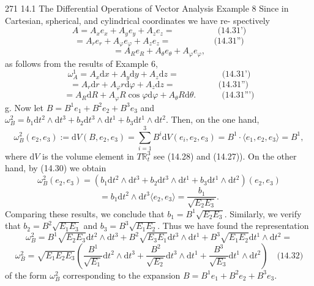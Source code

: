 271 14.1 The Differential Operations of Vector Analysis
Example 8 Since in Cartesian, spherical, and cylindrical coordinates we have re-
spectively
$$A = A_x e_x + A_y e_y + A_z e_z = \quad \quad \quad \quad \quad \text{(14.31')}$$
$$= A_r e_r + A_\varphi e_\varphi + A_z e_z = \quad \quad \quad \quad \quad \text{(14.31'')}$$
$$= A_R e_R + A_\theta e_\theta + A_\varphi e_\varphi,$$
as follows from the results of Example 6,
$$\omega^1_A = A_x \mathrm{d}x + A_y \mathrm{d}y + A_z \mathrm{d}z = \quad \quad \quad \quad \quad \text{(14.31')}$$
$$= A_r \mathrm{d}r + A_\varphi r \mathrm{d}\varphi + A_z \mathrm{d}z = \quad \quad \quad \quad \quad \text{(14.31'')}$$
$$= A_R \mathrm{d}R + A_\varphi R \cos \varphi \mathrm{d}\varphi + A_\theta R \mathrm{d}\theta. \quad \quad \quad \text{(14.31''')}$$
g.
Now let $B = B^1e_1+B^2e_2+ B^3e_3$ and $\omega^2_B = b_1 \mathrm{d}t^2 \wedge \mathrm{d}t^3+b_2 \mathrm{d}t^3 \wedge \mathrm{d}t^1 +b_3 \mathrm{d}t^1 \wedge \mathrm{d}t^2$.
Then, on the one hand,
$$\omega^2_B(e_2, e_3) := \mathrm{d}V(B, e_2, e_3) = \sum_{i=1}^3 B^i \mathrm{d}V(e_i, e_2, e_3) = B^1 \cdot \langle e_1, e_2, e_3 \rangle = B^1,$$
where $\mathrm{d}V$ is the volume element in $T\mathbb{R}^3_t$ see (14.28) and (14.27)).
On the other hand, by (14.30) we obtain
$$\omega^2_B(e_2, e_3) = (b_1 \mathrm{d}t^2 \wedge \mathrm{d}t^3 + b_2 \mathrm{d}t^3 \wedge \mathrm{d}t^1 + b_3 \mathrm{d}t^1 \wedge \mathrm{d}t^2) (e_2, e_3)$$
$$= b_1 \mathrm{d}t^2 \wedge \mathrm{d}t^3 \langle e_2, e_3 \rangle = \frac{b_1}{\sqrt{E_2 E_3}}.$$
Comparing these results, we conclude that $b_1 = B^1\sqrt{E_2 E_3}$. Similarly, we verify
that $b_2 = B^2\sqrt{E_1 E_3}$ and $b_3 = B^3\sqrt{E_1 E_2}$.
Thus we have found the representation
$$\omega^2_B = B^1\sqrt{E_2 E_3} \mathrm{d}t^2 \wedge \mathrm{d}t^3 + B^2\sqrt{E_3 E_1} \mathrm{d}t^3 \wedge \mathrm{d}t^1 + B^3\sqrt{E_1 E_2} \mathrm{d}t^1 \wedge \mathrm{d}t^2 =$$
$$\omega^2_B = \sqrt{E_1 E_2 E_3} \left( \frac{B^1}{\sqrt{E_1}} \mathrm{d}t^2 \wedge \mathrm{d}t^3 + \frac{B^2}{\sqrt{E_2}} \mathrm{d}t^3 \wedge \mathrm{d}t^1 + \frac{B^3}{\sqrt{E_3}} \mathrm{d}t^1 \wedge \mathrm{d}t^2 \right) \quad \text{(14.32)}$$
of the form $\omega^2_B$ corresponding to the expansion $B = B^1e_1 + B^2e_2 + B^3e_3$.